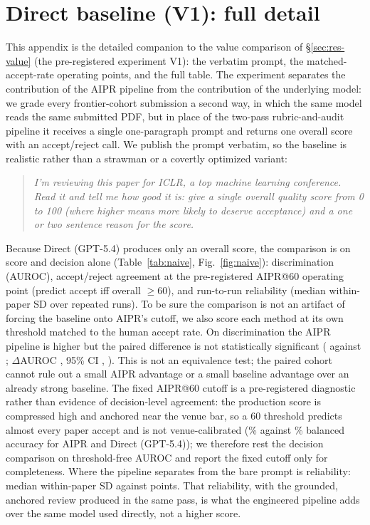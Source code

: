 \section{Direct baseline (V1): full detail}
\label{app:naive}
This appendix is the detailed companion to the value comparison of
\S\ref{sec:res-value} (the pre-registered experiment V1): the verbatim prompt, the
matched-accept-rate operating points, and the full table. The experiment
separates the contribution of the AIPR pipeline from the contribution of the
underlying model: we grade every frontier-cohort submission a second way, in which
the same model reads the same submitted PDF, but in place of the two-pass
rubric-and-audit pipeline it receives a single one-paragraph prompt and returns
one overall score with an accept/reject call. We publish the prompt verbatim, so
the baseline is realistic rather than a strawman or a covertly optimized variant:

\begin{quote}
\emph{I'm reviewing this paper for ICLR, a top machine learning conference. Read
it and tell me how good it is: give a single overall quality score from 0 to 100
(where higher means more likely to deserve acceptance) and a one or two sentence
reason for the score.}
\end{quote}

Because Direct (GPT-5.4) produces only an overall score, the comparison is on
score and decision alone (Table~\ref{tab:naive}, Fig.~\ref{fig:naive}):
discrimination (AUROC), accept/reject agreement at the pre-registered AIPR@60
operating point (predict accept iff overall $\ge 60$), and run-to-run reliability
(median within-paper SD over repeated runs). To be sure the comparison is not an
artifact of forcing the baseline onto AIPR's cutoff, we also score each method at
its own threshold matched to the human accept rate. On discrimination the AIPR
pipeline is higher but the paired difference is not statistically significant
(\aurocFullFull{} against \aurocNaiveFull{}; $\Delta$AUROC
\aurocDiffFullNaive, 95\% CI \aurocDiffCI, \aurocDiffPrel). This is not an
equivalence test; the paired cohort cannot rule out a small AIPR advantage or a
small baseline advantage over an already strong baseline. The fixed AIPR@60 cutoff is a pre-registered diagnostic rather than
evidence of decision-level agreement: the production score is compressed high and anchored
near the venue bar, so a 60 threshold predicts almost every paper accept and is not
venue-calibrated (\opSixtyFullAcc\% against \opSixtyNaiveAcc\% balanced accuracy for
AIPR and Direct (GPT-5.4)); we therefore rest the decision comparison on threshold-free
AUROC and report the fixed cutoff only for completeness. Where the pipeline separates
from the bare prompt is reliability: median within-paper SD \fullRunSD{} against
\naiveRunSD{} points. That reliability, with the grounded, anchored review produced
in the same pass, is what the engineered pipeline adds over the same model used
directly, not a higher score.


